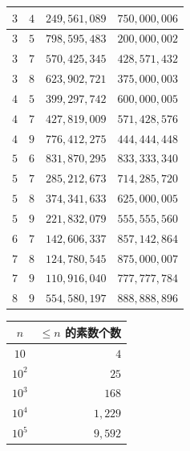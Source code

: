 \begin{center}
\begin{minipage}[t]{.6\linewidth}
\begin{tabular}{|c|c|r|r|}
            \hline
            $3$ & $4$ & $249,561,089$ & $750,000,006$ \\
            \hline
            $3$ & $5$ & $798,595,483$ & $200,000,002$ \\
            \hline
            $3$ & $7$ & $570,425,345$ & $428,571,432$ \\
            \hline
            $3$ & $8$ & $623,902,721$ & $375,000,003$ \\
            \hline
            $4$ & $5$ & $399,297,742$ & $600,000,005$ \\
            \hline
            $4$ & $7$ & $427,819,009$ & $571,428,576$ \\
            \hline
            $4$ & $9$ & $776,412,275$ & $444,444,448$ \\
            \hline
            $5$ & $6$ & $831,870,295$ & $833,333,340$ \\
            \hline
            $5$ & $7$ & $285,212,673$ & $714,285,720$ \\
            \hline
            $5$ & $8$ & $374,341,633$ & $625,000,005$ \\
            \hline
            $5$ & $9$ & $221,832,079$ & $555,555,560$ \\
            \hline
            $6$ & $7$ & $142,606,337$ & $857,142,864$ \\
            \hline
            $7$ & $8$ & $124,780,545$ & $875,000,007$ \\
            \hline
            $7$ & $9$ & $110,916,040$ & $777,777,784$ \\
            \hline
            $8$ & $9$ & $554,580,197$ & $888,888,896$ \\
            \hline
        \end{tabular}
    \end{minipage} %
    \begin{minipage}[t]{.3\linewidth}
        \vspace{0pt}
        \centering
        \begin{tabular}{|c|r|}
            \hline
            $n$ & $\le n$ 的素数个数 \\
            \hline
            $10$ & $4$ \\
            \hline
            $10^2$ & $25$ \\
            \hline
            $10^3$ & $168$ \\
            \hline
            $10^4$ & $1,229$ \\
            \hline
            $10^5$ & $9,592$ \\

\end{tabular}
\end{minipage}
\end{center}
